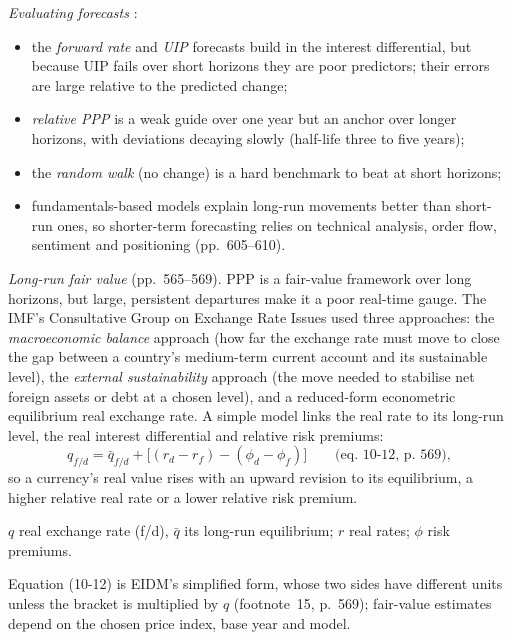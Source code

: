 \begin{qfmethod}\label{meth:exchange-rate-forecasting-fair-value}
 \emph{Evaluating forecasts} \citep[chap.~10, secs.~3.1--3.3 and~9, pp.~553--569 and~605--610]{economics-investment-decision-makers-2013}:
\begin{itemize}
\item the \emph{forward rate} and \emph{UIP} forecasts build in the interest differential, but because UIP fails over short horizons they are poor predictors; their errors are large relative to the predicted change;
\item \emph{relative PPP} is a weak guide over one year but an anchor over longer horizons, with deviations decaying slowly (half-life three to five years);
\item the \emph{random walk} (no change) is a hard benchmark to beat at short horizons;
\item fundamentals-based models explain long-run movements better than short-run ones, so shorter-term forecasting relies on technical analysis, order flow, sentiment and positioning (pp.~605--610).
\end{itemize}

\emph{Long-run fair value} (pp.~565--569). PPP is a fair-value framework over long horizons, but large, persistent departures make it a poor real-time gauge. The IMF's Consultative Group on Exchange Rate Issues used three approaches: the \emph{macroeconomic balance} approach (how far the exchange rate must move to close the gap between a country's medium-term current account and its sustainable level), the \emph{external sustainability} approach (the move needed to stabilise net foreign assets or debt at a chosen level), and a reduced-form econometric equilibrium real exchange rate. A simple model links the real rate to its long-run level, the real interest differential and relative risk premiums:
\[
q_{f/d}=\bar q_{f/d}+\big[(r_d-r_f)-(\phi_d-\phi_f)\big]\qquad\text{(eq.~10-12, p.~569)},
\]
so a currency's real value rises with an upward revision to its equilibrium, a higher relative real rate or a lower relative risk premium.

 $q$ real exchange rate (f/d), $\bar q$ its long-run equilibrium; $r$ real rates; $\phi$ risk premiums.

 Equation (10-12) is EIDM's simplified form, whose two sides have different units unless the bracket is multiplied by $q$ (footnote~15, p.~569); fair-value estimates depend on the chosen price index, base year and model.


\end{qfmethod}
